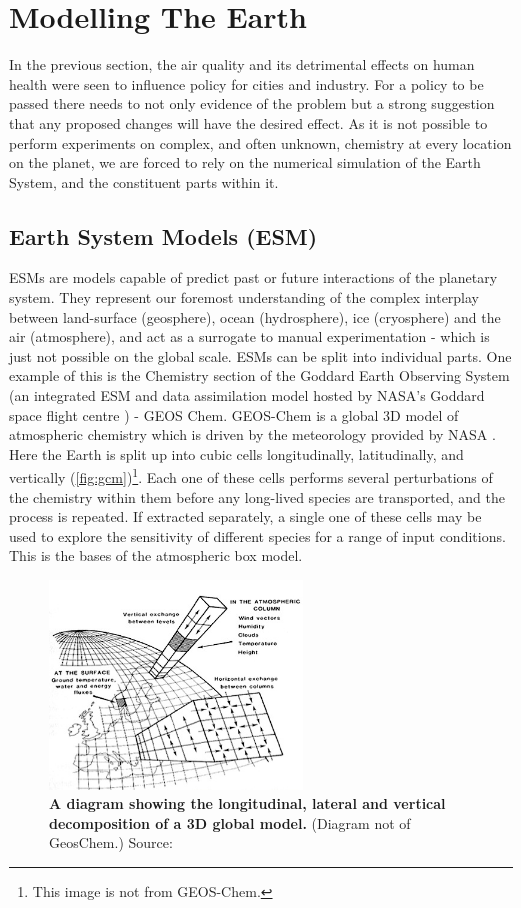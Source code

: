\section{Modelling The Earth}
In the previous section, the air quality and its detrimental effects on human health were seen to influence policy for cities and industry.
For a policy to be passed there needs to not only evidence of the problem but a strong suggestion that any proposed changes will have the desired effect. As it is not possible to perform experiments on complex, and often unknown, chemistry at every location on the planet, we are forced to rely on the numerical simulation of the Earth System, and the constituent parts within it.
\subsection{Earth System Models (ESM)}
  ESMs are models capable of predict past or future interactions of the planetary system. They represent our foremost understanding of the complex interplay between land-surface (geosphere), ocean (hydrosphere), ice (cryosphere) and the air (atmosphere), and act as a surrogate to manual experimentation -  which is just not possible on the global scale.
ESMs can be split into individual parts. One example of this is the Chemistry section of the Goddard Earth Observing System (an integrated ESM and data assimilation model hosted by NASA's Goddard space flight centre \citep{geosgit}) - GEOS Chem. GEOS-Chem is a global 3D model of atmospheric chemistry which is driven by the meteorology provided by NASA \citep{geos}. Here the Earth is split up into cubic cells longitudinally, latitudinally, and vertically (\autoref{fig:gcm})\footnote{This image is not from GEOS-Chem.}. Each one of these cells performs several perturbations of the chemistry within them before any long-lived species are transported, and the process is repeated. If extracted separately, a single one of these cells may be used to explore the sensitivity of different species for a range of input conditions. This is the bases of the atmospheric box model.
\begin{figure}
  \centering
  \includegraphics[width=0.6\textwidth]{gcm.jpg}
  \caption{\textbf{A diagram showing the longitudinal, lateral and vertical decomposition of a 3D global model.} (Diagram not of GeosChem.) Source: \citep{gcm}}
  \label{fig:gcm}
\end{figure}
